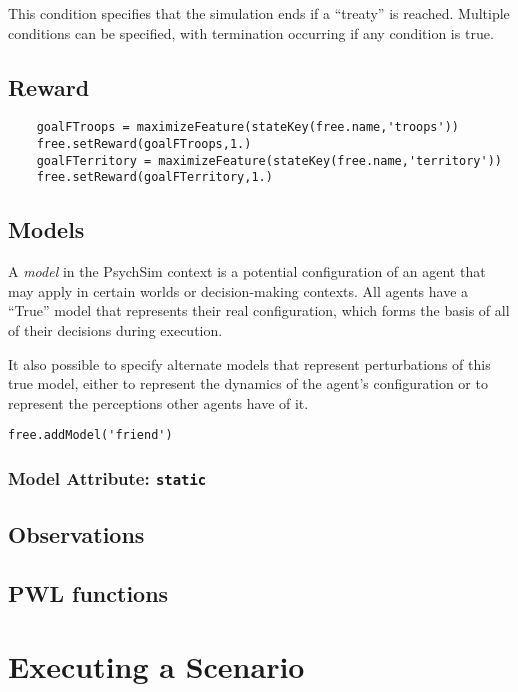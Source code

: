 \documentclass{book}
\begin{document}
This condition specifies that the simulation ends if a ``treaty'' is reached. Multiple conditions can be specified, with termination occurring if any condition is true.


\section{Reward}

\begin{verbatim}
    goalFTroops = maximizeFeature(stateKey(free.name,'troops'))
    free.setReward(goalFTroops,1.)
    goalFTerritory = maximizeFeature(stateKey(free.name,'territory'))
    free.setReward(goalFTerritory,1.)
\end{verbatim}

\section{Models}

A {\em model} in the PsychSim context is a potential configuration of an agent that may apply in certain worlds or decision-making contexts. All agents have a ``True'' model that represents their real configuration, which forms the basis of all of their decisions during execution. 


It also possible to specify alternate models that represent perturbations of this true model, either to represent the dynamics of the agent's configuration or to represent the perceptions other agents have of it.

\begin{verbatim}
free.addModel('friend')
\end{verbatim}

\subsection{Model Attribute: {\tt static}}

\section{Observations}

\section{PWL functions}\label{sec:pwl}

\chapter{Executing a Scenario}
\end{document}
